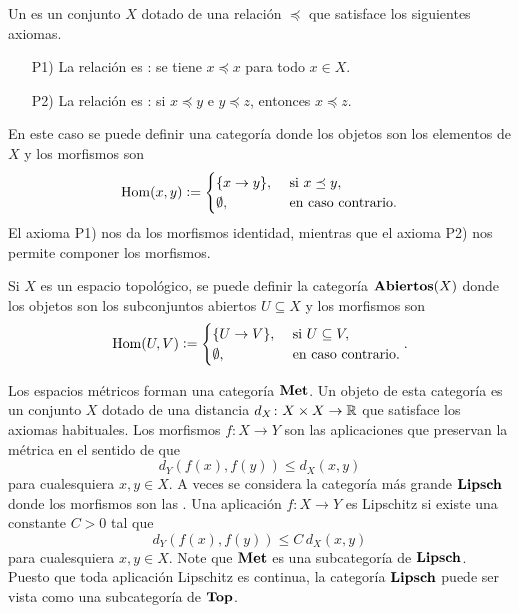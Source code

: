 \documentclass{article}
\numberwithin{equation}{section}
\theoremstyle{definition}
\begin{document}
\begin{ejemplo}
  \label{ejemplo:preorden-como-categoria}
  Un  es un conjunto $X$ dotado de una relación
  $\preceq$ que satisface los siguientes axiomas.

  \begin{enumerate}
  \item[P1)] La relación es : se tiene $x\preceq x$ para todo
    $x\in X$.

  \item[P2)] La relación es : si $x\preceq y$ e $y\preceq z$,
    entonces $x\preceq z$.
  \end{enumerate}

  En este caso se puede definir una categoría donde los objetos son los
  elementos de $X$ y los morfismos son
  \[ \operatorname{Hom} (x,y) \mathrel{\mathop:}= \begin{cases}
      \{ x\to y \}, & \text{ si }x\preceq y,\\
      \emptyset, & \text{ en caso contrario.}
    \end{cases} \]
  El axioma P1) nos da los morfismos identidad, mientras que el
  axioma P2) nos permite componer los morfismos.
\end{ejemplo}

\begin{ejemplo}
  \label{ejemplo:categoria-de-abiertos}
  Si $X$ es un espacio topológico, se puede definir la categoría
  $\text{\bf Abiertos} (X)$ donde los objetos son los subconjuntos abiertos
  $U\subseteq X$ y los morfismos son
  \[ \operatorname{Hom} (U,V) \mathrel{\mathop:}= \begin{cases}
      \{ U\to V \}, & \text{ si }U\subseteq V,\\
      \emptyset, & \text{ en caso contrario.}
    \end{cases}. \]
\end{ejemplo}

\begin{ejemplo}
  Los espacios métricos forman una categoría $\text{\bf Met}$. Un objeto de esta
  categoría es un conjunto $X$ dotado de una distancia
  $d_X\colon X\times X\to \mathbb{R}$ que satisface los axiomas habituales. Los
  morfismos $f\colon X\to Y$ son las aplicaciones que preservan la métrica en el
  sentido de que
  $$d_Y (f (x), f (y)) \le d_X (x,y)$$
  para cualesquiera $x,y\in X$. A veces se considera la categoría más grande
  $\text{\bf Lipsch}$ donde los morfismos son las
  . Una aplicación $f\colon X\to Y$ es Lipschitz si
  existe una constante $C > 0$ tal que
  $$d_Y (f (x), f (y)) \le C\,d_X (x,y)$$
  para cualesquiera $x,y\in X$. Note que $\text{\bf Met}$ es una subcategoría de
  $\text{\bf Lipsch}$. Puesto que toda aplicación Lipschitz es continua, la
  categoría $\text{\bf Lipsch}$ puede ser vista como una subcategoría de
  $\text{\bf Top}$.
\end{ejemplo}
\end{document}
